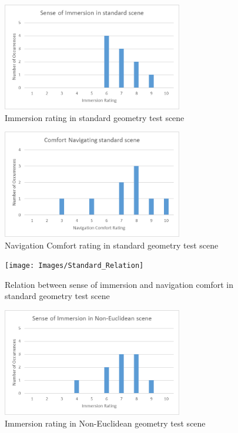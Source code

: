 	\begin{figure}
		\label{exp:fig:standard_immersion}
		\includegraphics[width=0.7\textwidth]{Images/Standard_Immersion}
		\centering
		\caption{Immersion rating in standard geometry test scene}
	\end{figure}

	\begin{figure}
		\label{exp:fig:standard_comfort}
		\includegraphics[width=0.7\textwidth]{Images/Standard_Comfort}
		\centering
		\caption{Navigation Comfort rating in standard geometry test scene}
	\end{figure}

	\begin{figure}
		\label{exp:fig:standard_relation}
		\texttt{[image: Images/Standard\_Relation]}
		\centering
		\caption{Relation between sense of immersion and navigation comfort in standard geometry test scene}
	\end{figure}

	\begin{figure}
		\label{exp:fig:ne_immersion}
		\includegraphics[width=0.7\textwidth]{Images/NE_Immersion}
		\centering
		\caption{Immersion rating in Non-Euclidean geometry test scene}
	\end{figure}


